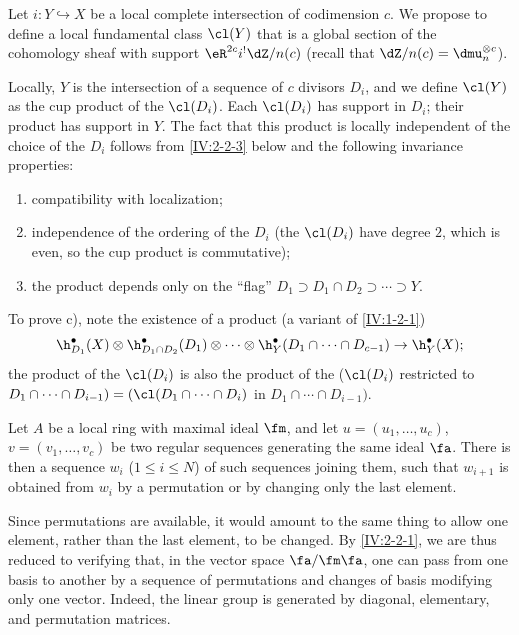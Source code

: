 \documentclass[oneside]{book}
\begin{document}
Let $i:Y\hookrightarrow X$ be a local complete intersection of codimension
$c$. We propose to define a local fundamental class $\cl(Y)$ that is a
global section of the cohomology sheaf with support
$\eR^{2c}i^! \dZ/n(c)$ (recall that $\dZ/n(c)=\dmu_n^{\otimes c}$).

Locally, $Y$ is the intersection of a sequence of $c$ divisors $D_i$, and we
define $\cl(Y)$ as the cup product of the $\cl(D_i)$. Each $\cl(D_i)$ has
support in $D_i$; their product has support in $Y$. The fact that this product
is locally independent of the choice of the $D_i$ follows from
\ref{IV:2-2-3} below and the following invariance properties:
\begin{enumerate}[\indent a)]
  \item compatibility with localization;
  \item independence of the ordering of the $D_i$ (the $\cl(D_i)$ have
    degree $2$, which is even, so the cup product is commutative);
  \item the product depends only on the ``flag''
    $D_1\supset D_1\cap D_2\supset \cdots\supset Y$.
\end{enumerate}
To prove c), note the existence of a product (a variant of
\ref{IV:1-2-1})
\[
  \h_{D_1}^\bullet(X)\otimes \h_{D_1\cap D_2}^\bullet(D_1)\otimes \cdots \otimes \h_Y^\bullet(D_1\cap \cdots \cap D_{c-1}) \to \h_Y^\bullet(X) \text{;}
\]
the product of the $\cl(D_i)$ is also the product of the
($\cl(D_i)$ restricted to
$D_1\cap \cdots \cap D_{i-1})=(\cl(D_1\cap \cdots \cap D_i)$ in
$D_1\cap \cdots \cap D_{i-1})$.






\begin{lemma}\label{IV:2-2-3}
Let $A$ be a local ring with maximal ideal $\fm$, and let
$u=(u_1,\dots,u_c)$, $v=(v_1,\dots,v_c)$ be two regular sequences generating
the same ideal $\fa$. There is then a sequence $w_i$
($1\leqslant i\leqslant N$) of such sequences joining them, such that
$w_{i+1}$ is obtained from $w_i$ by a permutation or by changing only the
last element.
\end{lemma}

Since permutations are available, it would amount to the same thing to allow
one element, rather than the last element, to be changed. By
\ref{IV:2-2-1}, we are thus reduced to verifying that, in the vector space
$\fa/\fm\fa$, one can pass from one basis to another by a sequence of
permutations and changes of basis modifying only one vector. Indeed, the
linear group is generated by diagonal, elementary, and permutation matrices.
\end{document}
